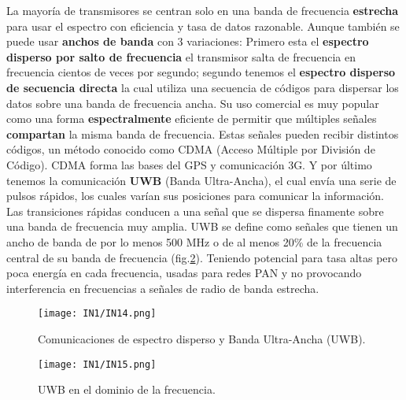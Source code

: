 \documentclass[
	12pt, %
	fleqn, %
	a4paper, %
	oneside, %
]{LegrandOrangeBook}
\begin{document}
La mayoría de transmisores se centran solo en una banda de frecuencia \textbf{estrecha} para usar el espectro con eficiencia y tasa de datos razonable. Aunque también se puede usar \textbf{anchos de banda} con 3 variaciones: Primero esta el \textbf{espectro disperso por salto de frecuencia} el transmisor salta de frecuencia en frecuencia cientos de veces por segundo; segundo tenemos el \textbf{espectro disperso de secuencia directa} la cual utiliza una secuencia de códigos para dispersar los datos sobre una banda de frecuencia ancha. Su uso comercial es muy popular como una forma \textbf{espectralmente} eficiente de permitir que múltiples señales \textbf{compartan} la misma banda de frecuencia. Estas señales pueden recibir distintos códigos, un método conocido como CDMA (Acceso Múltiple por División de Código). CDMA forma las bases del GPS y comunicación 3G. Y por último tenemos la comunicación \textbf{UWB} (Banda Ultra-Ancha), el cual envía una serie de pulsos rápidos, los cuales varían sus posiciones para comunicar la información. Las transiciones rápidas conducen a una señal que se dispersa finamente sobre una banda de frecuencia muy amplia. UWB se define como señales que tienen un ancho de banda de por lo menos 500 MHz o de al menos 20\% de la frecuencia central de su banda de frecuencia (fig.\ref{fig: uwb}). Teniendo potencial para tasa altas pero poca energía en cada frecuencia, usadas para redes PAN y no provocando interferencia en frecuencias a señales de radio de banda estrecha.
\begin{figure}[]
\centering
\texttt{[image: IN1/IN14.png]}
\caption{Comunicaciones de espectro disperso y Banda Ultra-Ancha (UWB).}
\label{fig:anchos de banda variaciones}
\end{figure}
\begin{figure}[H]
\centering
\texttt{[image: IN1/IN15.png]}
\caption{UWB en el dominio de la frecuencia.}
\label{fig: uwb}
\end{figure}
\end{document}
